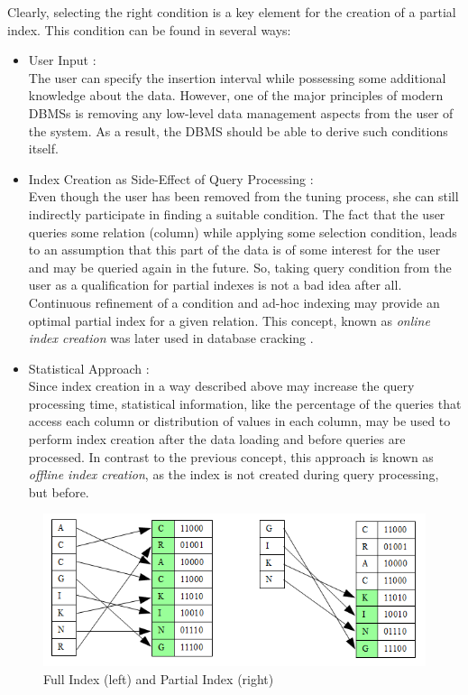 \documentclass[10pt, conference, compsocconf]{IEEEtran}
\begin{document}
Clearly, selecting the right condition is a key element for the creation of a partial index. This condition can be found in several ways:\\
\begin{itemize}

\item{User Input \cite{partial1}:}\\ The user can specify the insertion interval while possessing some additional knowledge about the data. However, one of the major principles of modern DBMSs is removing any low-level data management aspects from the user of the system. As a result, the DBMS should be able to derive such conditions itself.\\

\item{Index Creation as Side-Effect of Query Processing \cite{partial1}:}\\ Even though the user has been removed from the tuning process, she can still indirectly participate in finding a suitable condition. The fact that the user queries some relation (column) while applying some selection condition, leads to an assumption that this part of the data is of some interest for the user and may be queried again in the future. So, taking query condition from the user as a qualification for partial indexes is not a bad idea after all. Continuous refinement of a condition and ad-hoc indexing may provide an optimal partial index for a given relation. This concept, known as \emph{online index creation} was later used in database cracking \cite{cracking}.\\

\item{Statistical Approach \cite{partial2}:} \\Since index creation in a way described above may increase the query processing time, statistical information, like the percentage of the queries that access each column or distribution of values in each column, may be used to perform index creation after the data loading and before queries are processed. In contrast to the previous concept, this approach is known as \emph{offline index creation}, as the index is not created during query processing, but before.
\end{itemize}

\begin{figure}[h]
\centering
\includegraphics[width=\columnwidth]{partial.png}
\caption{Full Index (left) and Partial Index (right)}
\end{figure}
\end{document}
